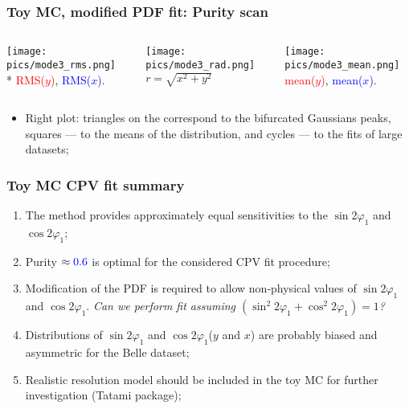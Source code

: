 \documentclass[10 pt,compress,mathserif]{beamer}
\newcommand{\cosbeta}{\ensuremath{\cos{2\varphi_1}}\xspace}
\newcommand{\sinbeta}{\ensuremath{\sin{2\varphi_1}}\xspace}
\newcommand{\cosbetasq}{\ensuremath{\cos^2{2\varphi_1}}\xspace}
\newcommand{\sinbetasq}{\ensuremath{\sin^2{2\varphi_1}}\xspace}
\begin{document}
\begin{frame}
 \frametitle{Toy MC, modified PDF fit: Purity scan}
 \begin{small} 
 \begin{columns}
  \begin{column}{0.33\textwidth}
  \begin{center}
   \texttt{[image: pics/mode3\_rms.png]}\\*
   \textcolor{red}{RMS($y$)}, \textcolor{blue}{RMS($x$)}.
  \end{center}
  \end{column}
  \begin{column}{0.33\textwidth}
  \begin{center}
   \texttt{[image: pics/mode3\_rad.png]}\\
   $r=\sqrt{x^2+y^2}$
  \end{center}
  \end{column}
  \begin{column}{0.33\textwidth}
  \begin{center}
   \texttt{[image: pics/mode3\_mean.png]}\\
   \textcolor{red}{mean($y$)}, \textcolor{blue}{mean($x$)}.
  \end{center}
  \end{column}
 \end{columns}
 \begin{itemize}
  \item Right plot: triangles on the correspond to the bifurcated Gaussians peaks, squares --- to the means of the distribution, and cycles --- to the fits of large datasets;
 \end{itemize}
 \end{small}
\end{frame}

\begin{frame}
 \frametitle{Toy MC CPV fit summary}
 \begin{enumerate}
  \item The method provides approximately equal sensitivities to the \sinbeta and \cosbeta;
  \item Purity $\approx\textcolor{blue}{0.6}$ is optimal for the considered CPV fit procedure;
  \item Modification of the PDF is required to allow non-physical values of \sinbeta and \cosbeta. {\it Can we perform fit assuming $(\sinbetasq+\cosbetasq)=1$?}
  \item Distributions of \sinbeta and \cosbeta ($y$ and $x$) are probably biased and asymmetric for the Belle dataset;
  \item Realistic resolution model should be included in the toy MC for further investigation (Tatami package);
 \end{enumerate}
\end{frame}
\end{document}
